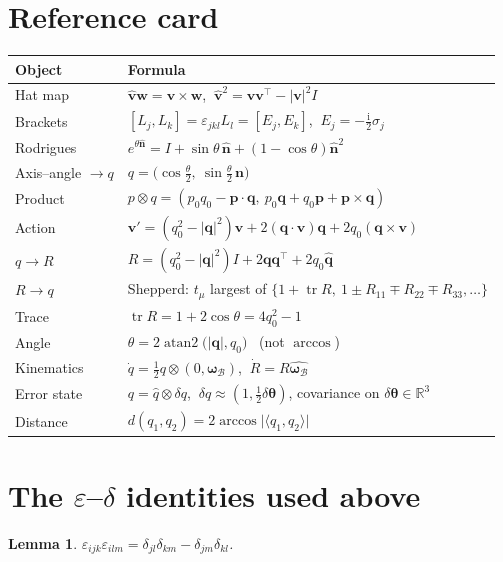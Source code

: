 \documentclass[11pt]{article}
\DeclareMathOperator{\tr}{tr}
\newcommand{\R}{\mathbb{R}}
\newcommand{\vv}[1]{\bm{#1}}
\newcommand{\hatmap}[1]{\widehat{#1}}
\newcommand{\ii}{\mathrm{i}}
\newcommand{\halfth}{\tfrac{\theta}{2}}
\theoremstyle{plain}
\newtheorem{lemma}[theorem]{Lemma}
\theoremstyle{definition}
\begin{document}
\section{Reference card}

\begin{center}
\begin{tabular}{@{}ll@{}}
\hline
\textbf{Object} & \textbf{Formula}\\
\hline
Hat map & $\hatmap{\vv v}\vv w=\vv v\times\vv w$, $\ \hatmap{\vv v}^2=\vv v\vv v^{\!\top}-|\vv v|^2I$\\
Brackets & $[L_j,L_k]=\varepsilon_{jkl}L_l=[E_j,E_k]$, $\ E_j=-\tfrac{\ii}{2}\sigma_j$\\
Rodrigues & $e^{\theta\hatmap{\vv n}}=I+\sin\theta\,\hatmap{\vv n}+(1-\cos\theta)\hatmap{\vv n}^2$\\
Axis--angle $\to q$ & $q=\big(\cos\halfth,\ \sin\halfth\,\vv n\big)$\\
Product & $p\otimes q=(p_0q_0-\vv p\cdot\vv q,\ p_0\vv q+q_0\vv p+\vv p\times\vv q)$\\
Action & $\vv v'=(q_0^2-|\vv q|^2)\vv v+2(\vv q\cdot\vv v)\vv q+2q_0(\vv q\times\vv v)$\\
$q\to R$ & $R=(q_0^2-|\vv q|^2)I+2\vv q\vv q^{\!\top}+2q_0\hatmap{\vv q}$\\
$R\to q$ & Shepperd: $t_\mu$ largest of $\{1+\tr R,\ 1\pm R_{11}\mp R_{22}\mp R_{33},\dots\}$\\
Trace & $\tr R=1+2\cos\theta=4q_0^2-1$\\
Angle & $\theta=2\operatorname{atan2}\big(|\vv q|,q_0\big)$ \ (not $\arccos$)\\
Kinematics & $\dot q=\tfrac12q\otimes(0,\bm\omega_{\mathcal B})$, $\ \dot R=R\hatmap{\bm\omega_{\mathcal B}}$\\
Error state & $q=\hat q\otimes\delta q$, $\ \delta q\approx(1,\tfrac12\delta\bm\theta)$, covariance on $\delta\bm\theta\in\R^3$\\
Distance & $d(q_1,q_2)=2\arccos\big|\langle q_1,q_2\rangle\big|$\\
\hline
\end{tabular}
\end{center}

\appendix

\section{The $\varepsilon$--$\delta$ identities used above}\label{app:eps}

\begin{lemma}\label{lem:epsdelta}
$\varepsilon_{ijk}\varepsilon_{ilm}=\delta_{jl}\delta_{km}-\delta_{jm}\delta_{kl}$.
\end{lemma}
\end{document}
